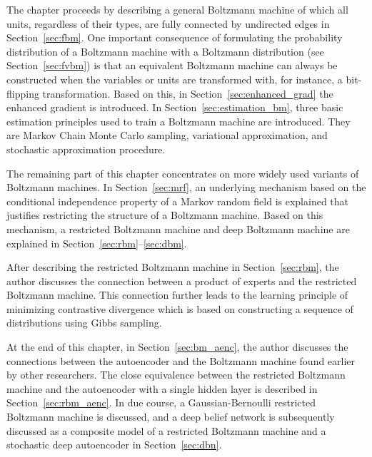 \documentclass{now}
\newcommand{\alert}[1]{\textcolor{red}{#1}}
\newcommand{\citepub}[1]{\alert{#1}}
\begin{document}
The chapter proceeds by describing a general Boltzmann machine of which all
units, regardless of their types, are fully connected by undirected edges in
Section~\ref{sec:fbm}. One important consequence of formulating the probability
distribution of a Boltzmann machine with a Boltzmann distribution (see
Section~\ref{sec:fvbm}) is that an equivalent Boltzmann machine can always be
constructed when the variables or units are transformed with, for instance, a
bit-flipping transformation. Based on this, in Section~\ref{sec:enhanced_grad}
the enhanced gradient 
is introduced.
In Section~\ref{sec:estimation_bm}, three basic estimation principles used to
train a Boltzmann machine are introduced. They are Markov Chain Monte Carlo
sampling, variational approximation, and stochastic approximation procedure. 

The remaining part of this chapter concentrates on more widely used variants of
Boltzmann machines. In Section~\ref{sec:mrf}, an underlying mechanism based on
the conditional independence property of a Markov random field is explained
that justifies restricting the structure of a Boltzmann machine. Based on this
mechanism, a restricted Boltzmann machine and deep Boltzmann machine are
explained in Section~\ref{sec:rbm}--\ref{sec:dbm}.

After describing the restricted Boltzmann machine in Section~\ref{sec:rbm}, the
author discusses the connection between a product of experts and the restricted
Boltzmann machine. This connection further leads to the learning principle of
minimizing contrastive divergence which is based on constructing a sequence of
distributions using Gibbs sampling.

At the end of this chapter, in Section~\ref{sec:bm_aenc}, the author discusses
the connections between the autoencoder and the Boltzmann machine found earlier
by other researchers. The close equivalence between the restricted Boltzmann
machine and the autoencoder with a single hidden layer is described in
Section~\ref{sec:rbm_aenc}. In due course, a Gaussian-Bernoulli restricted
Boltzmann machine is discussed, and
a deep belief network is subsequently discussed as a composite model of a
restricted Boltzmann machine and a stochastic deep autoencoder in
Section~\ref{sec:dbn}.
\end{document}
